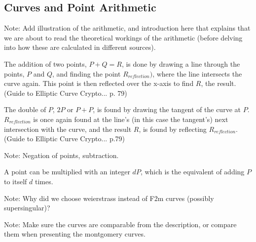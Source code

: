 \subsection{Curves and Point Arithmetic}

Note: Add illustration of the arithmetic, and introduction here that explains that we are about to read
the theoretical workings of the arithmetic (before delving into how these are calculated in different
sources).

The addition of two points, \(P + Q = R\), is done by drawing a line through the points, \(P\) and \(Q\),
and finding the point \(R_{reflection})\), where the line intersects the curve again. This point is
then reflected over the x-axis to find \(R\), the result. (Guide to Elliptic Curve Crypto... p. 79)

The double of \(P\), \(2P\) or \(P+P\), is found by drawing the tangent of the curve at \(P\).
\(R_{reflection}\) is once again found at the line's (in this case the tangent's) next intersection
with the curve, and the result \(R\), is found by reflecting \(R_{reflection}\). (Guide to Elliptic Curve Crypto... p.79)

Note: Negation of points, subtraction.

A point can be multiplied with an integer \(dP\), which is the equivalent of adding \(P\) to itself \(d\) times.

Note: Why did we choose weierstrass instead of F2m curves (possibly supersingular)?

Note: Make sure the curves are comparable from the description, or compare them when presenting
the montgomery curves.



